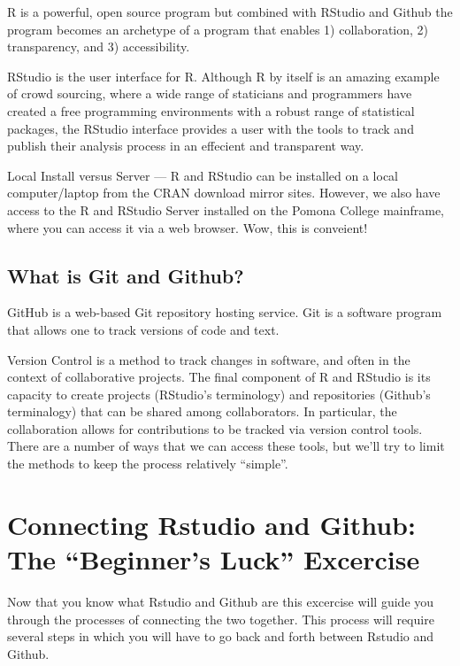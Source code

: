 \documentclass{article}\usepackage[]{graphicx}\usepackage[]{color}
\begin{document}
R is a powerful, open source program but combined with RStudio and Github the program becomes an archetype of a program that enables 1) collaboration, 2) transparency, and 3) accessibility.
  
RStudio is the user interface for R. Although R by itself is an amazing example of crowd sourcing, where a wide range of staticians and programmers have created a free programming environments with a robust range of statistical packages, the RStudio interface provides a user with the tools to track and publish their analysis process in an effecient and transparent way. 
  
Local Install versus Server --- R and RStudio can be installed on a local computer/laptop from the CRAN download mirror sites. However, we also have access to the R and RStudio Server installed on the Pomona College mainframe, where you can access it via a web browser. Wow, this is conveient!
  
  \subsection{What is Git and Github?}

GitHub is a web-based Git repository hosting service. Git is a software program that allows one to track versions of code and text.

Version Control is a method to track changes in software, and often in the context of collaborative projects. The final component of R and RStudio is its capacity to create projects (RStudio's terminology) and repositories (Github's terminalogy) that can be shared among collaborators. In particular, the collaboration allows for contributions to be tracked via version control tools. There are a number of ways that we can access these tools, but we'll try to limit the methods to keep the process relatively ``simple''.
  
  
  
\section{Connecting Rstudio and Github: The ``Beginner's Luck'' Excercise}
Now that you know what Rstudio and Github are this excercise will guide you through the processes of connecting the two together. This process will require several steps in which you will have to go back and forth between Rstudio and Github. 
\end{document}
